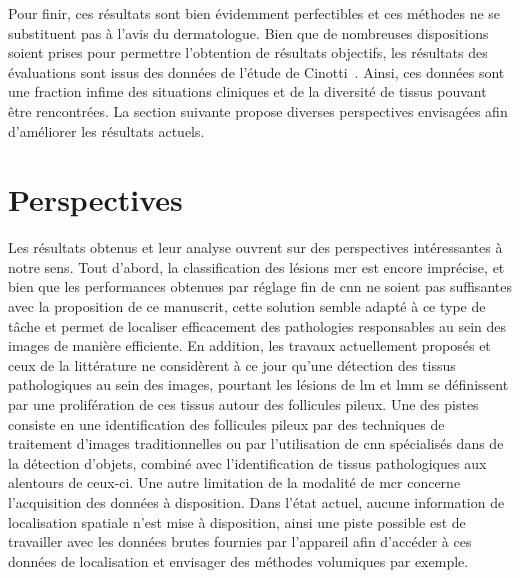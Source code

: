 Pour finir, ces résultats sont bien évidemment perfectibles et ces méthodes ne se substituent pas à l'avis du dermatologue. Bien que de nombreuses dispositions soient prises pour permettre l'obtention de résultats objectifs, les résultats des évaluations sont issus des données de l'étude de Cinotti~. Ainsi, ces données sont une fraction infime des situations cliniques et de la diversité de tissus pouvant être rencontrées. La section suivante propose diverses perspectives envisagées afin d'améliorer les résultats actuels.\par
\clearpage

\section*{Perspectives}
Les résultats obtenus et leur analyse ouvrent sur des perspectives intéressantes à notre sens. Tout d'abord, la classification des lésions \gls{mcr} est encore imprécise, et bien que les performances obtenues par réglage fin de \gls{cnn} ne soient pas suffisantes avec la proposition de ce manuscrit, cette solution semble adapté à ce type de tâche et permet de localiser efficacement des pathologies responsables au sein des images de manière efficiente. En addition, les travaux actuellement proposés et ceux de la littérature ne considèrent à ce jour qu'une détection des tissus pathologiques au sein des images, pourtant les lésions de \gls{lm} et \gls{lmm} se définissent par une prolifération de ces tissus autour des follicules pileux. Une des pistes consiste en une identification des follicules pileux par des techniques de traitement d'images traditionnelles ou par l'utilisation de \gls{cnn} spécialisés dans de la détection d'objets, combiné avec l'identification de tissus pathologiques aux alentours de ceux-ci. Une autre limitation de la modalité de \gls{mcr} concerne l'acquisition des données à disposition. Dans l'état actuel, aucune information de localisation spatiale n'est mise à disposition, ainsi une piste possible est de travailler avec les données brutes fournies par l'appareil afin d'accéder à ces données de localisation et envisager des méthodes volumiques par exemple.\par

